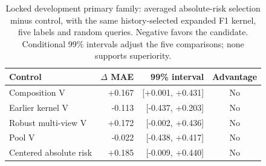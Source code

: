 \begin{table}[htbp]\centering\small
\caption{Locked development primary family: averaged absolute-risk selection minus control, with the same history-selected expanded F1 kernel, five labels and random queries. Negative favors the candidate. Conditional 99\% intervals adjust the five comparisons; none supports superiority.}\label{tab:step10primary}
\begin{tabular}{lrrc}\toprule
Control & $\Delta$ MAE & 99\% interval & Advantage \\ \midrule
Composition V & +0.167 & [+0.001, +0.431] & No \\
Earlier kernel V & -0.113 & [-0.437, +0.203] & No \\
Robust multi-view V & +0.172 & [-0.002, +0.436] & No \\
Pool V & -0.022 & [-0.438, +0.417] & No \\
Centered absolute risk & +0.185 & [-0.009, +0.440] & No \\
\bottomrule\end{tabular}
\end{table}
